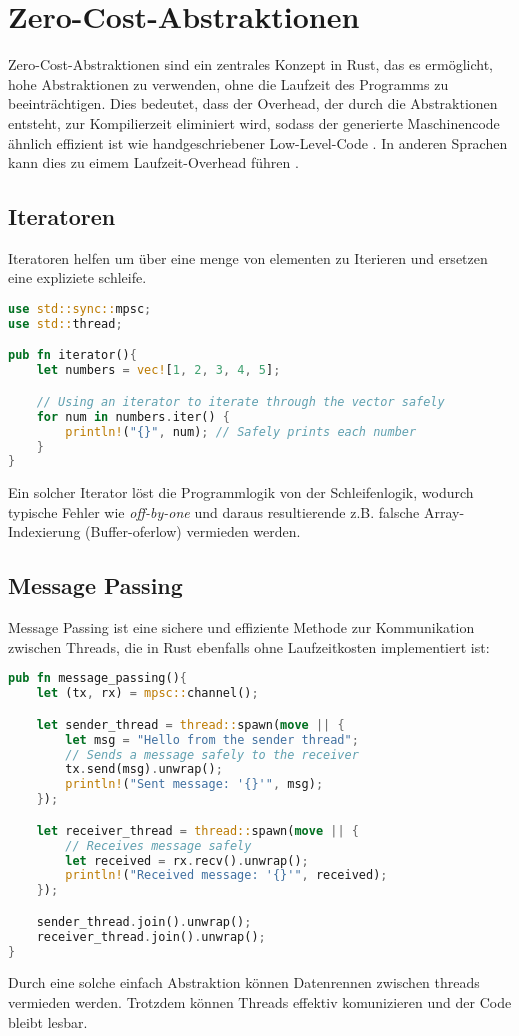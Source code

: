 \chapter{Zero-Cost-Abstraktionen}

Zero-Cost-Abstraktionen sind ein zentrales Konzept in Rust, das es ermöglicht, hohe Abstraktionen zu verwenden, ohne die Laufzeit des Programms zu beeinträchtigen.
Dies bedeutet, dass der Overhead, der durch die Abstraktionen entsteht, zur Kompilierzeit eliminiert wird, sodass der generierte Maschinencode ähnlich effizient ist wie handgeschriebener Low-Level-Code \cite{sequeira2023}.
In anderen Sprachen kann dies zu eimem Laufzeit-Overhead führen \cite{haberman2014}.

\section{Iteratoren}
Iteratoren helfen um über eine menge von elementen zu Iterieren und ersetzen eine expliziete schleife.
\begin{lstlisting}[language=Rust, caption=Iterator]
use std::sync::mpsc;
use std::thread;

pub fn iterator(){
    let numbers = vec![1, 2, 3, 4, 5];

    // Using an iterator to iterate through the vector safely
    for num in numbers.iter() {
        println!("{}", num); // Safely prints each number
    }
}
\end{lstlisting}
Ein solcher Iterator löst die Programmlogik von der Schleifenlogik, wodurch typische Fehler wie \textit{\gls{off-by-one}} und daraus resultierende z.B. falsche Array-Indexierung (Buffer-oferlow) vermieden werden.
\cleardoublepage
\section{Message Passing}

Message Passing ist eine sichere und effiziente Methode zur Kommunikation zwischen Threads, die in Rust ebenfalls ohne Laufzeitkosten implementiert ist:

\begin{lstlisting}[language=Rust, caption=Message Passing ]
pub fn message_passing(){
    let (tx, rx) = mpsc::channel();

    let sender_thread = thread::spawn(move || {
        let msg = "Hello from the sender thread";
        // Sends a message safely to the receiver
        tx.send(msg).unwrap(); 
        println!("Sent message: '{}'", msg);
    });

    let receiver_thread = thread::spawn(move || {
        // Receives message safely
        let received = rx.recv().unwrap(); 
        println!("Received message: '{}'", received);
    });

    sender_thread.join().unwrap();
    receiver_thread.join().unwrap();
}
\end{lstlisting}
Durch eine solche einfach Abstraktion können Datenrennen zwischen threads vermieden werden.
Trotzdem können Threads effektiv komunizieren und der Code bleibt lesbar.
\cleardoublepage
